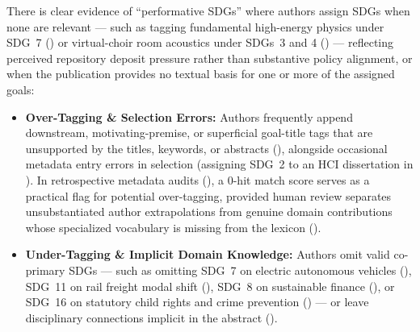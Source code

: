 There is clear evidence of \enquote{performative \glspl{SDG}} where authors assign \glspl{SDG} \first when none are relevant --- such as tagging fundamental high-energy physics under \gls{SDG}~7 () or virtual-choir room acoustics under \glspl{SDG}~3 and 4 () --- reflecting perceived repository deposit pressure rather than substantive policy alignment, or \Second when the publication provides no textual basis for one or more of the assigned goals:
\begin{itemize}
    \item \textbf{Over-Tagging \& Selection Errors:} Authors frequently append downstream, motivating-premise, or superficial goal-title tags that are unsupported by the titles, keywords, or abstracts (\eg {}), alongside occasional metadata entry errors in selection (\eg assigning \gls{SDG}~2 to an \gls{HCI} dissertation in ). In retrospective metadata audits (), a \num{0}-hit match score serves as a practical flag for potential over-tagging, provided human review separates unsubstantiated author extrapolations from genuine domain contributions whose specialized vocabulary is missing from the lexicon ().

    \item \textbf{Under-Tagging \& Implicit Domain Knowledge:} Authors omit valid co-primary \glspl{SDG} --- such as omitting \gls{SDG}~7 on electric autonomous vehicles (), \gls{SDG}~11 on rail freight modal shift (), \gls{SDG}~8 on sustainable finance (), or \gls{SDG}~16 on statutory child rights and crime prevention () --- or leave disciplinary connections implicit in the abstract ().
\end{itemize}


